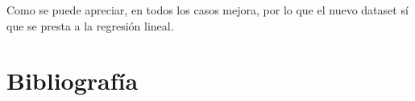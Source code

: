 Como se puede apreciar, en todos los casos mejora, por lo que el nuevo dataset sí que se presta a la regresión lineal.
\newpage
\section{Bibliografía}




